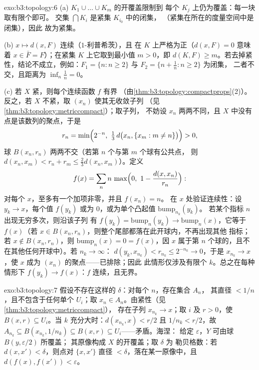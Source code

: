 \begin{solution}{exo:b3:topology:6}
(a) $K_1 \cup \dots \cup K_m$ 的开覆盖限制到
每个 $K_j$ 上仍为覆盖：每一块取有限个即可。
交集 $\bigcap K_i$ 是紧集 $K_{i_0}$ 中的闭集，
（紧集在所在的度量空间中是闭集），因此
故为紧集。

(b) $x \mapsto d(x, F)$ 连续（$1$-利普希茨），且
在 $K$ 上严格为正（$d(x, F) = 0$ 意味着 $x \in \bar F =
F$）；在紧集 $K$ 上它取到最小值 $m > 0$，即 $d(K, F)
\geq m$。若去掉紧性，结论不成立，例如：$F_1 = \{n : n \geq
2\}$ 与 $F_2 = \{n + \frac1n : n \geq 2\}$ 为闭集，
二者不交，且距离为 $\inf_n \frac1n = 0$。

(c) 若 $X$ 紧，则每个连续函数 $f$ 有界
（由\cref{thm:b3:topology:compactprops}(2)）。反之，若 $X$
不紧，取 $(x_n)$ 使其无收敛子列
（见\cref{thm:b3:topology:metriccompact}）；取子列，
不妨设 $x_n$ 两两不同，且
$X$ 中没有点是该数列的聚点，于是
\[
r_n = \min\Bigl(2^{-n},\ \tfrac13\,d\bigl(x_n, \{x_m : m \neq
n\}\bigr)\Bigr) > 0,
\]
球 $B(x_n, r_n)$ 两两不交（若第 $n$ 个与第 $m$ 个球有公共点，
则 $d(x_n, x_m) < r_n +
r_m \leq \frac23 d(x_n, x_m)$）。定义
\[
f(x) = \sum_{n} n\,\max\Bigl(0,\ 1 - \frac{d(x,
x_n)}{r_n}\Bigr):
\]
对每个 $x$，至多有一个加项非零，并且 $f(x_n) = n$。
在 $x$ 处验证连续性：设 $y_k \to x$，每个值 $f(y_k)$
或为 $0$，或为单个凸起值 $\mathrm{bump}_{n_k}(y_k)$。
若某个指标 $n$ 出现无穷多次，则沿该子列
有 $f(y_k) = \mathrm{bump}_n(y_k) \to
\mathrm{bump}_n(x)$，它等于 $f(x)$（若 $x \in B(x_n,
r_n)$，则整个尾部都落在此开球内，不再出现其他
指标；若 $x \notin B(x_n, r_n)$，则
$\mathrm{bump}_n(x) = 0 = f(x)$，因 $x$
属于第 $n$ 个球的，且不在其他任何开球中）。若 $n_k \to \infty$：
$d(y_k, x_{n_k}) < r_{n_k} \leq 2^{-n_k} \to 0$，于是 $x_{n_k}
\to x$，使 $x$ 成为 $(x_n)$ 的聚点——已排除；因此
此情形仅涉及有限个 $k$。总之在每种情形下
$f(y_k) \to f(x)$：$f$ 连续，且无界。
\end{solution}

\begin{solution}{exo:b3:topology:7}
假设不存在这样的 $\delta$：对每个 $n$，存在集合 $A_n$，
其直径 $< 1/n$，且不包含于任何单个 $U_i$；取 $x_n \in
A_n$。由紧性（见\cref{thm:b3:topology:metriccompact}），
存在子列 $x_{n_k} \to x$；取 $i$ 及 $r > 0$，使 $B(x,
r) \subseteq U_i$。当 $k$ 充分大时：$d(x_{n_k}, x) < r/2$ 且
$1/n_k < r/2$，故 $A_{n_k} \subseteq B(x_{n_k}, 1/n_k)
\subseteq B(x, r) \subseteq U_i$——矛盾。海涅：
给定 $\varepsilon$，$Y$ 可由球 $B(y, \varepsilon/2)$ 所覆盖；
其原像构成 $X$ 的开覆盖；取 $\delta$ 为
勒贝格数：若 $d(x, x') < \delta$，则点对 $\{x, x'\}$
直径 $< \delta$，落在某一原像中，且 $d(f(x),
f(x')) < \varepsilon$。
\end{solution}

